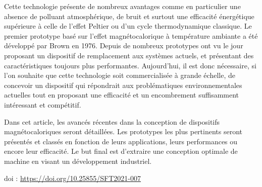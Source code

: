 {Cette technologie présente de nombreux avantages comme en particulier une absence de polluant atmosphérique, de bruit et surtout une efficacité énergétique supérieure à celle de l'effet Peltier ou d'un cycle thermodynamique classique. Le premier prototype basé sur l'effet magnétocalorique à température ambiante a été développé par Brown en 1976. Depuis de nombreux prototypes ont vu le jour proposant un dispositif de remplacement aux systèmes actuels, et présentant des caractéristiques toujours plus performantes. Aujourd'hui, il est donc nécessaire, si l'on souhaite que cette technologie soit commercialisée à grande échelle, de concevoir un dispositif qui répondrait aux problématiques environnementales actuelles tout en proposant une efficacité et un encombrement suffisamment intéressant et compétitif. 







Dans cet article, les avancés récentes dans la conception de dispositifs magnétocaloriques seront détaillées. Les prototypes les plus pertinents seront présentés et classés en fonction de leurs applications, leurs performances ou encore leur efficacité. Le but final est d'extraire une conception optimale de machine en visant un développement industriel.

 \vfill doi : \url{https://doi.org/10.25855/SFT2021-007}

}
 
